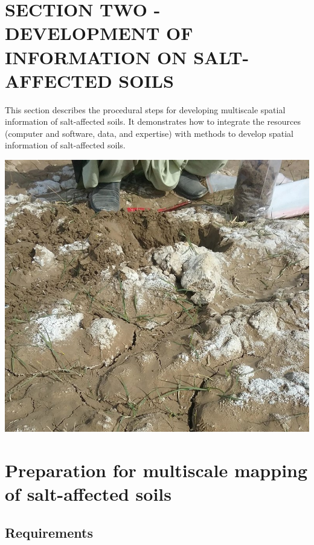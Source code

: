\documentclass[
  10pt,
  b5paper,
]{book}
\begin{document}
\hypertarget{section-two---development-of-information-on-salt-affected-soils}{%
\chapter*{SECTION TWO - DEVELOPMENT OF INFORMATION ON SALT-AFFECTED SOILS}\label{section-two---development-of-information-on-salt-affected-soils}}

This section describes the procedural steps for developing multiscale spatial information of salt-affected soils. It demonstrates how to integrate the resources (computer and software, data, and expertise) with methods to develop spatial information of salt-affected soils.

\includegraphics{figures/images/Figure_sectionII.jpg}

\hypertarget{preparation-for-multiscale-mapping-of-salt-affected-soils}{%
\chapter{Preparation for multiscale mapping of salt-affected soils}\label{preparation-for-multiscale-mapping-of-salt-affected-soils}}

\hypertarget{requirements}{%
\section{Requirements}\label{requirements}}
\end{document}
